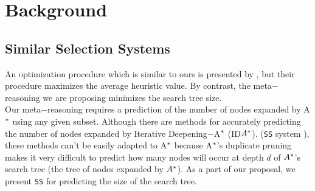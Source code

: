 
 
\chapter{Background}\label{background}

\section{Similar Selection Systems}

\noindent
An optimization procedure which is similar to ours is presented by \cite{raynersss13}, but their procedure maximizes the average heuristic value. By contrast, the meta$-$reasoning we are proposing minimizes the search tree size.\\

Our meta$-$reasoning requires a prediction of the number of nodes expanded by A$\sp{*}$ using any given subset. Although there are methods for accurately predicting the number of nodes expanded by Iterative Deepening$-$A$\sp{*}$ \cite{Korf85ida} (ID$A\sp{*}$). (\texttt{SS} system  \cite{lelis2013predicting}), these methods can't be easily adapted to A$\sp{*}$ because A$\sp{*}$'s duplicate pruning makes it very difficult to predict how many nodes will occur at depth $d$ of $A\sp{*}$'s search tree (the tree of nodes expanded by $A\sp{*}$). As a part of our proposal, we present \texttt{SS} for predicting the size of the search tree.

